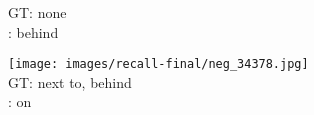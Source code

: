 \documentclass[10pt,twocolumn,letterpaper]{article}
\begin{document}
\begin{figure*}[t]
\begin{minipage}[b]{0.18\textwidth}
       	\small{
       	GT: none\\
       	\cite{Lu16}: behind
       	}
       	\vspace{0.3ex}
    \end{minipage}
    \hspace{0.005\textwidth}  
\begin{minipage}[b]{0.18\textwidth}
    	\centering
       	\texttt{[image: images/recall-final/neg\_34378.jpg]}\\
       	\vspace{0.2ex}
       	\small{
       	GT: next to, behind\\
       	\cite{Lu16}: on
       	}
      	\vspace{0.3ex}
    \end{minipage} 
    

\end{figure*}
\end{document}
